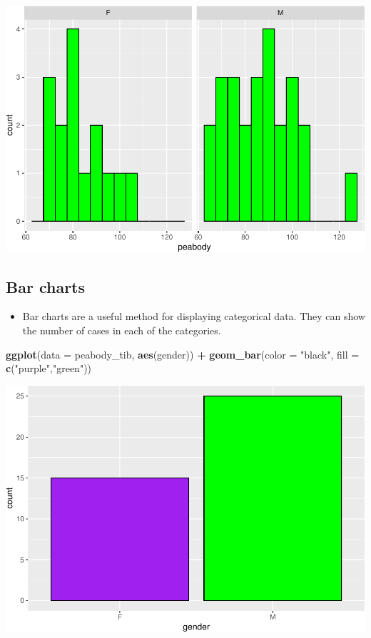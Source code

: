 \documentclass[
]{book}
\newenvironment{Shaded}{\begin{snugshade}}{\end{snugshade}}
\newcommand{\AttributeTok}[1]{\textcolor[rgb]{0.13,0.29,0.53}{#1}}
\newcommand{\FunctionTok}[1]{\textcolor[rgb]{0.13,0.29,0.53}{\textbf{#1}}}
\newcommand{\NormalTok}[1]{#1}
\newcommand{\SpecialCharTok}[1]{\textcolor[rgb]{0.81,0.36,0.00}{\textbf{#1}}}
\newcommand{\StringTok}[1]{\textcolor[rgb]{0.31,0.60,0.02}{#1}}
\providecommand{\tightlist}{%
  \setlength{\itemsep}{0pt}\setlength{\parskip}{0pt}}
\begin{document}
\includegraphics{PSY202A-Modeling-I.Heo_files/figure-latex/unnamed-chunk-78-1.pdf}

\subsection{Bar charts}\label{bar-charts}

\begin{itemize}
\tightlist
\item
  Bar charts are a useful method for displaying categorical data. They can show the number of cases in each of the categories.
\end{itemize}

\begin{Shaded}
\begin{Highlighting}[]
\FunctionTok{ggplot}\NormalTok{(}\AttributeTok{data =}\NormalTok{ peabody\_tib, }\FunctionTok{aes}\NormalTok{(gender)) }\SpecialCharTok{+}
  \FunctionTok{geom\_bar}\NormalTok{(}\AttributeTok{color =} \StringTok{"black"}\NormalTok{, }\AttributeTok{fill =} \FunctionTok{c}\NormalTok{(}\StringTok{"purple"}\NormalTok{,}\StringTok{"green"}\NormalTok{))}
\end{Highlighting}
\end{Shaded}

\includegraphics{PSY202A-Modeling-I.Heo_files/figure-latex/unnamed-chunk-79-1.pdf}
\end{document}
